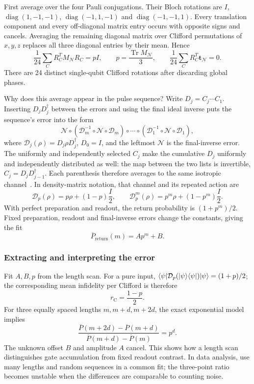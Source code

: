 First average over the four Pauli conjugations. Their Bloch
rotations are $I$, $\operatorname{diag}(1,-1,-1)$,
$\operatorname{diag}(-1,1,-1)$ and
$\operatorname{diag}(-1,-1,1)$. Every translation component
and every off-diagonal matrix entry occurs with opposite signs
and cancels. Averaging the remaining diagonal matrix over
Clifford permutations of $x,y,z$ replaces all three diagonal
entries by their mean. Hence
\begin{equation}
 \frac1{24}\sum_C R_C^T M_{\mathcal N}R_C=pI,\qquad
 p=\frac{\operatorname{Tr}M_{\mathcal N}}3,\qquad
 \frac1{24}\sum_C R_C^T\mathbf t_{\mathcal N}=0.
 \label{eq:calibration-clifford-average}
\end{equation}
There are 24 distinct single-qubit Clifford rotations after
discarding global phases.

Why does this average appear in the pulse sequence?
Write $D_j=C_j\cdots C_1$. Inserting $D_jD_j^\dagger$
between the errors and using the final ideal inverse puts the
sequence's error into the form
\[
 \mathcal N\circ
 ( \mathcal D_m^{-1}\circ\mathcal N\circ\mathcal D_m)
 \circ\cdots\circ
 ( \mathcal D_1^{-1}\circ\mathcal N\circ\mathcal D_1),
\]
where $\mathcal D_j(\rho)=D_j\rho D_j^\dagger$, $D_0=I$, and the leftmost
$\mathcal N$ is the final-inverse error.
The uniformly and independently selected $C_j$ make the
cumulative $D_j$ uniformly and independently distributed as
well: the map between the two lists is invertible,
$C_j=D_jD_{j-1}^\dagger$. Each parenthesis therefore averages
to the same isotropic channel~\cite{Magesan2012}.
In density-matrix notation, that channel and its repeated action are
\begin{equation}
 \mathcal D_p(\rho)=p\rho+(1-p)\frac I2,\qquad
 \mathcal D_p^m(\rho)=p^m\rho+(1-p^m)\frac I2.
 \label{eq:calibration-rb-channel}
\end{equation}
With perfect preparation and readout, the return probability is
$(1+p^m)/2$. Fixed preparation, readout and final-inverse errors
change the constants, giving the fit
\begin{equation}
 \overline P_{\mathrm{return}}(m)=A p^m+B.
 \label{eq:calibration-rb-fit}
\end{equation}
\subsubsection{Extracting and interpreting the error}
Fit $A,B,p$ from the length scan. For a pure input,
$\langle \psi\rvert\mathcal D_p(\lvert \psi\rangle\langle \psi\rvert)\lvert \psi\rangle=(1+p)/2$;
the corresponding mean infidelity per Clifford is therefore
\begin{equation}
 r_{\mathrm C}=\frac{1-p}{2}.
 \label{eq:calibration-rb-infidelity}
\end{equation}
For three equally spaced lengths $m,m+d,m+2d$, the exact
exponential model implies
\[
 \frac{\overline P(m+2d)-\overline P(m+d)}
      {\overline P(m+d)-\overline P(m)}=p^d.
\]
The unknown offset $B$ and amplitude $A$ cancel. This shows how
a length scan distinguishes gate accumulation from fixed readout
contrast. In data analysis, use many lengths and random sequences
in a common fit; the three-point ratio becomes unstable when the
differences are comparable to counting noise.


